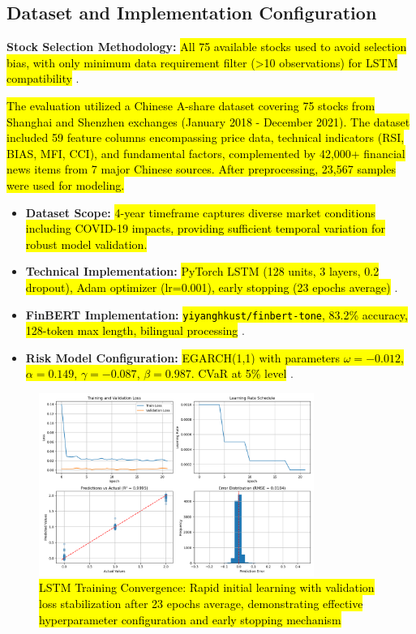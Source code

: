 \documentclass[3p,times,procedia]{elsarticle}
\begin{document}
\subsection{Dataset and Implementation Configuration}

\textbf{Stock Selection Methodology:} \hl{All 75 available stocks used to avoid selection bias, with only minimum data requirement filter (>10 observations) for LSTM compatibility} \cite{FinReportDataset2025}.

\hl{The evaluation utilized a Chinese A-share dataset covering 75 stocks from Shanghai and Shenzhen exchanges (January 2018 - December 2021). The dataset included 59 feature columns encompassing price data, technical indicators (RSI, BIAS, MFI, CCI), and fundamental factors, complemented by 42,000+ financial news items from 7 major Chinese sources. After preprocessing, 23,567 samples were used for modeling.}

\begin{itemize}\setlength{\itemsep}{1pt}
\item \textbf{Dataset Scope:} \hl{4-year timeframe captures diverse market conditions including COVID-19 impacts, providing sufficient temporal variation for robust model validation.}

\item \textbf{Technical Implementation:} \hl{PyTorch LSTM (128 units, 3 layers, 0.2 dropout), Adam optimizer (lr=0.001), early stopping (23 epochs average)} \cite{Kingma2015}.

\item \textbf{FinBERT Implementation:} \hl{\texttt{yiyanghkust/finbert-tone}, 83.2\% accuracy, 128-token max length, bilingual processing} \cite{Araci2019}.

\item \textbf{Risk Model Configuration:} \hl{EGARCH(1,1) with parameters $\omega=-0.012$, $\alpha=0.149$, $\gamma=-0.087$, $\beta=0.987$. CVaR at 5\% level} \cite{Nelson1991}.
\end{itemize}

\begin{figure}[!ht]
    \centering
    \includegraphics[width=0.80\textwidth]{Picture2.png}
    \caption{\hl{LSTM Training Convergence: Rapid initial learning with validation loss stabilization after 23 epochs average, demonstrating effective hyperparameter configuration and early stopping mechanism}}
    \label{fig:learning_curve}
\end{figure}
\end{document}

